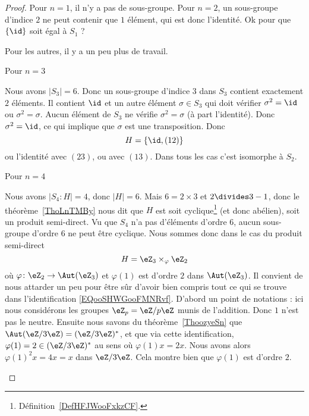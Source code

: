 \begin{proof}
	Pour \( n=1\), il n'y a pas de sous-groupe. Pour \( n=2\), un sous-groupe d'indice \( 2\) ne peut contenir que \( 1\) élément, qui est donc l'identité. Ok pour que \( \{ \id \}\) soit égal à \( S_1\) ?

	Pour les autres, il y a un peu plus de travail.

	\begin{subproof}
		\item[Pour \( n=3\)]

		Nous avons \( | S_3 |=6\). Donc un sous-groupe d'indice $3$ dans \( S_3\) contient exactement \( 2\) éléments. Il contient \( \id\) et un autre élément \( \sigma\in S_3\) qui doit vérifier \( \sigma^2=\id\) ou \( \sigma^2=\sigma\). Aucun élément de \( S_3\) ne vérifie \( \sigma^2=\sigma\) (à part l'identité). Donc \( \sigma^2=\id\), ce qui implique que \( \sigma\) est une transposition. Donc
		\begin{equation}
			H=\{ \id,(12) \}
		\end{equation}
		ou l'identité avec \( (23)\), ou avec \( (13)\). Dans tous les cas c'est isomorphe à \( S_2\).

		\item[Pour \( n=4\)]

		Nous avons \( | S_4:H |=4\), donc \( | H |=6\). Mais \( 6=2\times 3\) et \( 2\divides 3-1\), donc le théorème~\ref{ThoLnTMBy} nous dit que \( H\) est soit cyclique\footnote{Définition~\ref{DefHFJWooFxkzCF}.} (et donc abélien), soit un produit semi-direct. Vu que \( S_4\) n'a pas d'éléments d'ordre $6$, aucun sous-groupe d'ordre \( 6\) ne peut être cyclique. Nous sommes donc dans le cas du produit semi-direct
		\begin{equation}        \label{EQooSHWGooFMNRvf}
			H=\eZ_3\times_{\varphi}\eZ_2
		\end{equation}
		où \( \varphi\colon \eZ_2\to \Aut(\eZ_3)\) et \( \varphi(1)\) est d'ordre \( 2\) dans \( \Aut(\eZ_3)\). Il convient de nous attarder un peu pour être sûr d'avoir bien compris tout ce qui se trouve dans l'identification \eqref{EQooSHWGooFMNRvf}. D'abord un point de notations : ici nous considérons les groupes \( \eZ_p=\eZ/p\eZ\) munis de l'addition. Donc \( 1\) n'est pas le neutre. Ensuite nous savons du théorème~\ref{ThoozyeSn} que \( \Aut(\eZ/3\eZ)=(\eZ/3\eZ)^*\), et que via cette identification, \( \varphi(1)=2\in(\eZ/3\eZ)^*\) au sens où \( \varphi(1)x=2x\). Nous avons alors \( \varphi(1)^2x=4x=x\) dans \( \eZ/3\eZ\). Cela montre bien que \( \varphi(1)\) est d'ordre \( 2\).


\end{subproof}
\end{proof}
